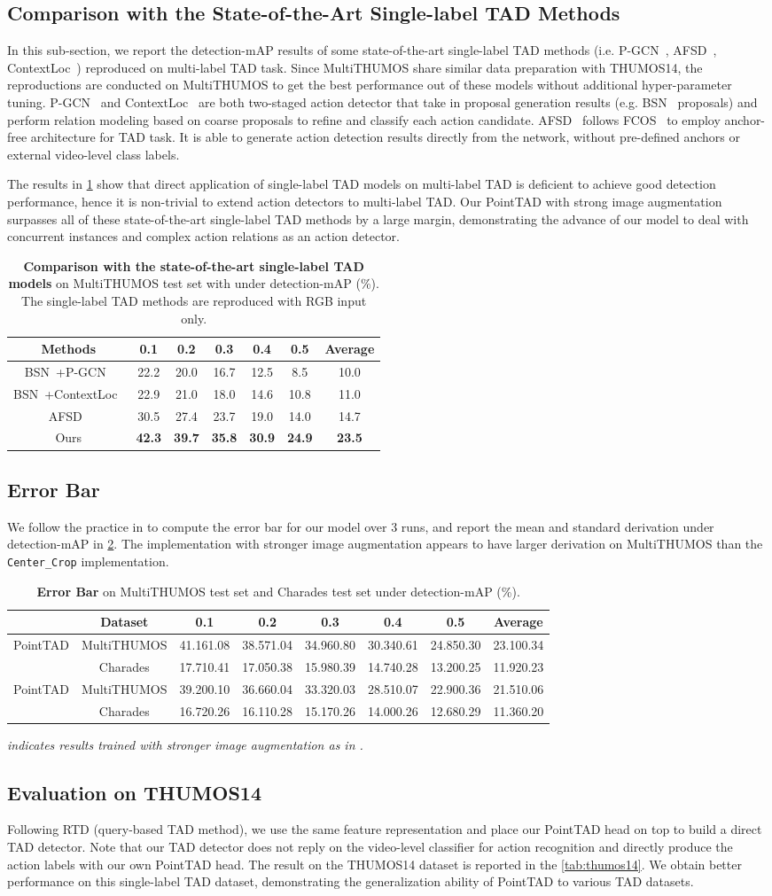 \documentclass{article}
\makeatletter
\newcommand{\headrule}{\toprule}
\newcommand{\TableTAD}{
\begin{table}[ht]
    \centering
    \small
    \renewcommand\arraystretch{0.9}
    \setlength{\tabcolsep}{15pt}
    \caption{\textbf{Comparison with the state-of-the-art single-label TAD models} on MultiTHUMOS test set with under detection-mAP (\%). The single-label TAD methods are reproduced with RGB input only.}
    \vspace{1em}
    \begin{tabular}{@{}ccccccc@{}}
\headrule
Methods       & 0.1  & 0.2  & 0.3  & 0.4  & 0.5  & Average \\ \midrule
BSN~\cite{DBLP:conf/eccv/LinZSWY18}+P-GCN~\cite{DBLP:conf/iccv/ZengHGTRZH19}     
&  22.2    &  20.0    &  16.7    &  12.5    & 8.5    &  10.0      \\ 
BSN~\cite{DBLP:conf/eccv/LinZSWY18}+ContextLoc~\cite{DBLP:conf/iccv/ZhuT00021}         
& 22.9 &  21.0  &  18.0  & 14.6  & 10.8  &   11.0      \\
AFSD~\cite{DBLP:conf/cvpr/Lin0LWTWLHF21}          
& 30.5 & 27.4 & 23.7 & 19.0 & 14.0 & 14.7 \\ \midrule
Ours          
& {\bf 42.3} & {\bf 39.7} & {\bf 35.8} & {\bf 30.9} & {\bf 24.9} & {\bf 23.5} \\ \bottomrule
\end{tabular}
    \label{tab:sota_tad}
\end{table}
}
\newcommand{\TableErrorBar}{
\begin{table}[ht]
\centering
    \small
    \renewcommand\arraystretch{1}
    \setlength{\tabcolsep}{2.5pt}
    \caption{\textbf{Error Bar} on MultiTHUMOS test set and Charades test set under detection-mAP (\%).}
    \vspace{1em}
    \begin{tabular}{@{}cccccccc@{}}
\headrule
 & Dataset       & 0.1  & 0.2  & 0.3  & 0.4  & 0.5  & Average \\ \midrule
\multirow{2}{*}{PointTAD} & MultiTHUMOS  
& {41.161.08} & {38.571.04} & {34.960.80} & {30.340.61} & { 24.850.30} & { 23.100.34}   \\
& Charades
& {17.710.41} & {17.050.38} & {15.980.39} & {14.740.28} & {13.200.25} & {11.920.23} \\ \midrule
\multirow{2}{*}{PointTAD} &MultiTHUMOS  
& {39.200.10} & {36.660.04} & {33.320.03} & {28.510.07} & {22.900.36} & {21.510.06}  \\
& Charades
& {16.720.26} & {16.110.28} & {15.170.26} & {14.000.26} & {12.680.29} & {11.360.20} \\ 
\bottomrule
\end{tabular}
\begin{tablenotes}
\item \small{\em  indicates results trained with stronger image augmentation as in \cite{liu2022an}.}
\end{tablenotes}
    \label{tab:error_bar}
\end{table}
}
\makeatother
\begin{document}
\subsection{Comparison with the State-of-the-Art Single-label TAD Methods}
In this sub-section, we report the detection-mAP results of some state-of-the-art single-label TAD methods (i.e. P-GCN~\cite{DBLP:conf/iccv/ZengHGTRZH19}, AFSD~\cite{DBLP:conf/cvpr/Lin0LWTWLHF21}, ContextLoc~\cite{DBLP:conf/iccv/ZhuT00021}) reproduced on multi-label TAD task. 
Since MultiTHUMOS share similar data preparation with THUMOS14, the reproductions are conducted on MultiTHUMOS to get the best performance out of these models without additional hyper-parameter tuning. 
P-GCN~\cite{DBLP:conf/iccv/ZengHGTRZH19} and ContextLoc~\cite{DBLP:conf/iccv/ZhuT00021} are both two-staged action detector that take in proposal generation results (e.g. BSN~\cite{DBLP:conf/eccv/LinZSWY18} proposals) and perform relation modeling based on coarse proposals to refine and classify each action candidate.
AFSD~\cite{DBLP:conf/cvpr/Lin0LWTWLHF21} follows FCOS~\cite{DBLP:conf/iccv/TianSCH19} to employ anchor-free architecture for TAD task. It is able to generate action detection results directly from the network, without pre-defined anchors or external video-level class labels.

The results in \cref{tab:sota_tad} show that direct application of single-label TAD models on multi-label TAD is deficient to achieve good detection performance, hence it is non-trivial to extend action detectors to multi-label TAD. Our PointTAD with strong image augmentation surpasses all of these state-of-the-art single-label TAD methods by a large margin, demonstrating the advance of our model to deal with concurrent instances and complex action relations as an action detector. 

\TableTAD

\subsection{{Error Bar}}
We follow the practice in \cite{riad2022diffstride} to compute the {error bar} for our model over 3 runs, and report the mean and standard derivation under detection-mAP in \cref{tab:error_bar}. The implementation with stronger image augmentation appears to have larger derivation on MultiTHUMOS than the \texttt{Center\_Crop} implementation.

\TableErrorBar

\subsection{Evaluation on THUMOS14}
Following RTD (query-based TAD method), we use the same feature representation and place our PointTAD head on top to build a direct TAD detector. Note that our TAD detector does not reply on the video-level classifier for action recognition and directly produce the action labels with our own PointTAD head. The result on the THUMOS14 dataset is reported in the \cref{tab:thumos14}. We obtain better performance on this single-label TAD dataset, demonstrating the generalization ability of PointTAD to various TAD datasets. 
\end{document}
